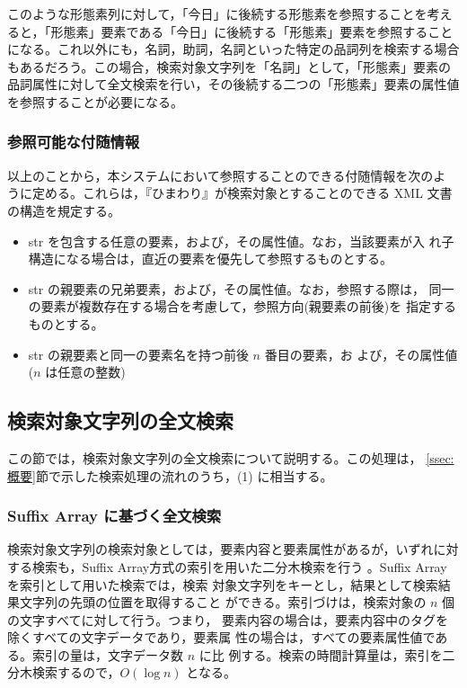 このような形態素列に対して，「今日」に後続する形態素を参照することを考え
ると，「形態素」要素である「今日」に後続する「形態素」要素を参照すること
になる。これ以外にも，名詞，助詞，名詞といった特定の品詞列を検索する場合
もあるだろう。この場合，検索対象文字列を「名詞」として，「形態素」要素の
品詞属性に対して全文検索を行い，その後続する二つの「形態素」要素の属性値
を参照することが必要になる。


\subsubsection{参照可能な付随情報}
\label{sss:付随情報}
以上のことから，本システムにおいて参照することのできる付随情報を次のよ
うに定める。これらは，『ひまわり』が検索対象とすることのできる XML 文書
の構造を規定する。

\begin{itemize}
 \item str を包含する任意の要素，および，その属性値。なお，当該要素が入
       れ子構造になる場合は，直近の要素を優先して参照するものとする。
 \item str の親要素の兄弟要素，および，その属性値。なお，参照する際は，
       同一の要素が複数存在する場合を考慮して，参照方向(親要素の前後)を
       指定するものとする。
 \item str の親要素と同一の要素名を持つ前後 $n$ 番目の要素，お
       よび，その属性値($n$ は任意の整数)
\end{itemize}


\subsection{検索対象文字列の全文検索}
この節では，検索対象文字列の全文検索について説明する。この処理は，
\ref{ssec:概要}節で示した検索処理の流れのうち，(1) に相当する。

\subsubsection{Suffix Array に基づく全文検索}
検索対象文字列の検索対象としては，要素内容と要素属性があるが，いずれに対
する検索も，Suffix Array方式の索引を用いた二分木検索を行う
。Suffix Array を索引として用いた検索では，検索
対象文字列をキーとし，結果として検索結果文字列の先頭の位置を取得すること
ができる。索引づけは，検索対象の $n$ 個の文字すべてに対して行う。つまり，
要素内容の場合は，要素内容中のタグを除くすべての文字データであり，要素属
性の場合は，すべての要素属性値である。索引の量は，文字データ数 $n$ に比
例する。検索の時間計算量は，索引を二分木検索するので，$O(\log n)$ となる。

